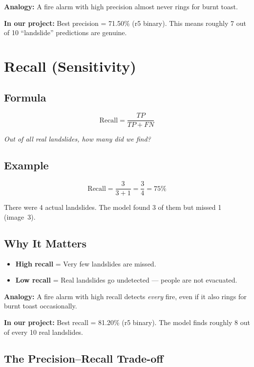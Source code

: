 \documentclass[11pt]{article}
\begin{document}
\noindent\textbf{Analogy:} A fire alarm with high precision almost never rings for burnt toast.

\medskip
\noindent\textbf{In our project:} Best precision = 71.50\% (r5 binary).
This means roughly 7 out of 10 ``landslide'' predictions are genuine.

\section{Recall (Sensitivity)}

\subsection{Formula}
\[
\text{Recall} = \frac{TP}{TP + FN}
\]

\noindent\textit{Out of all real landslides, how many did we find?}

\subsection{Example}
\[
\text{Recall} = \frac{3}{3 + 1} = \frac{3}{4} = \boxed{75\%}
\]

\noindent There were 4 actual landslides. The model found 3 of them but missed 1 (image~3).

\subsection{Why It Matters}

\begin{itemize}[noitemsep]
    \item \textbf{High recall} = Very few landslides are missed.
    \item \textbf{Low recall} = Real landslides go undetected --- people are not evacuated.
\end{itemize}

\noindent\textbf{Analogy:} A fire alarm with high recall detects \emph{every} fire, even if it also rings for burnt toast occasionally.

\medskip
\noindent\textbf{In our project:} Best recall = 81.20\% (r5 binary).
The model finds roughly 8 out of every 10 real landslides.

\subsection{The Precision--Recall Trade-off}
\end{document}
